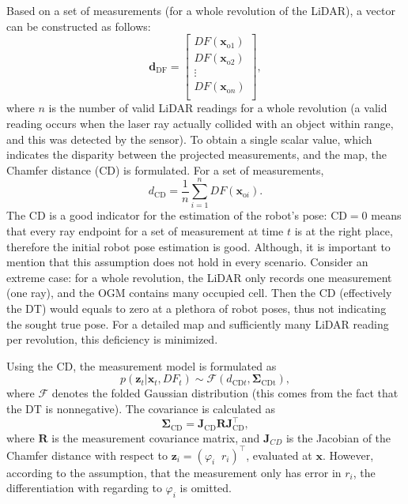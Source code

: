 Based on a set of measurements (for a whole revolution of the LiDAR), a vector can be constructed as follows:
\begin{equation}\label{eq:df-vector}
    \mathbf{d}_{\text{DF}} =
    \begin{bmatrix}
        DF(\mathbf{x}_{\text{o}1}) \\
        DF(\mathbf{x}_{\text{o}2}) \\
        \vdots                     \\
        DF(\mathbf{x}_{\text{o}n}) \\
    \end{bmatrix},
\end{equation}
where $n$ is the number of valid LiDAR readings for a whole revolution
(a valid reading occurs when the laser ray actually collided with an object within range, and this was
detected by the sensor).
To obtain a single scalar value, which indicates the disparity between the projected measurements,
and the map, the Chamfer distance (CD) is formulated. For a set of measurements,
\begin{equation}
    d_{\text{CD}} = \frac{1}{n}\sum_{i=1}^nDF(\mathbf{x}_{\text{o}i}).
\end{equation}
The CD is a good indicator for the estimation of the robot's pose: $\mathrm{CD}=0$ means
that every ray endpoint for a set of measurement at time $t$ is at the right place,
therefore the initial robot pose estimation is good.
Although, it is important to mention that this assumption does not hold in every
scenario. Consider an extreme case: for a whole revolution, the LiDAR only records
one measurement (one ray), and the OGM contains many occupied cell.
Then the CD (effectively the DT) would equals to zero at a plethora of robot poses, thus not indicating the sought true pose.
For a detailed map and sufficiently many LiDAR reading per revolution, this deficiency is minimized.

Using the CD, the measurement model is formulated as
\begin{equation}
    p(\mathbf{\mathbf{z}}_t | \mathbf{x}_t, DF_t) \sim \mathcal{F}(d_{\text{CD}t},\boldsymbol\Sigma_{\text{CDt}}),
\end{equation}
where $\mathcal{F}$ denotes the folded Gaussian distribution (this comes from the fact that the DT is nonnegative).
The covariance is calculated as
\begin{equation}
    \boldsymbol\Sigma_{\text{CD}} = \mathbf{J}_{\text{CD}}\mathbf{R}\mathbf{J}_{\text{CD}}^{\top},
\end{equation}
where $\mathbf{R}$ is the measurement covariance matrix, and $\mathbf{J}_{CD}$ is the Jacobian of the
Chamfer distance with respect to $\mathbf{z}_i = (\varphi_i\;\;r_i)^{\top}$,
evaluated at $\mathbf{x}$. However, according to the assumption, that the measurement only has error
in $r_i$, the differentiation with regarding to $\varphi_i$ is omitted.

